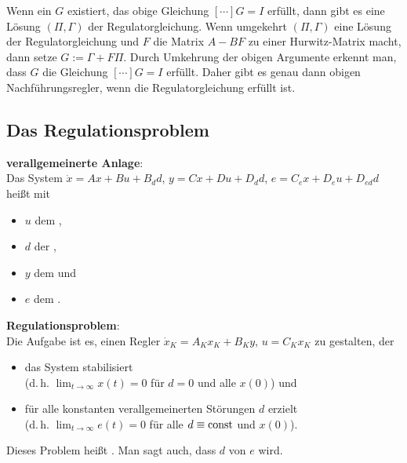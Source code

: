 Wenn ein $G$ existiert, das obige Gleichung $[\dotsb]G = I$ erfüllt,
dann gibt es eine Lösung $(\Pi, \Gamma)$ der Regulatorgleichung.
Wenn umgekehrt $(\Pi, \Gamma)$ eine Lösung der Regulatorgleichung und $F$ die Matrix
$A - BF$ zu einer Hurwitz-Matrix macht, dann setze $G := \Gamma + F\Pi$.
Durch Umkehrung der obigen Argumente erkennt man, dass $G$ die Gleichung $[\dotsb]G = I$ erfüllt.
Daher gibt es genau dann obigen Nachführungsregler, wenn die Regulatorgleichung erfüllt ist.

\pagebreak

\subsection{%
    Das Regulationsproblem%
}

\textbf{verallgemeinerte Anlage}:\\
Das System $\dot{x} = Ax + Bu + B_d d$, $y = Cx + Du + D_d d$, $e = C_e x + D_e u + D_{ed} d$
heißt  mit
\begin{itemize}
    \item
    $u$ dem ,

    \item
    $d$ der ,

    \item
    $y$ dem  und

    \item
    $e$ dem .
\end{itemize}

\textbf{Regulationsproblem}:\\
Die Aufgabe ist es, einen Regler $\dot{x}_K = A_K x_K + B_K y$, $u = C_K x_K$
zu gestalten, der
\begin{itemize}
    \item
    das System stabilisiert\\
    (d.\,h. $\lim_{t \to \infty} x(t) = 0$ für $d = 0$ und alle $x(0)$) und

    \item
    für alle konstanten verallgemeinerten Störungen $d$ erzielt\\
    (d.\,h. $\lim_{t \to \infty} e(t) = 0$ für alle $d \equiv \text{const}$ und $x(0)$).
\end{itemize}
Dieses Problem heißt .
Man sagt auch, dass $d$ von $e$
 wird.

